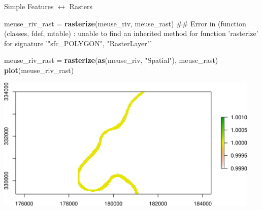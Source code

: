 \documentclass[11pt,ignorenonframetext,]{beamer}
\newenvironment{Shaded}{}{}
\newcommand{\KeywordTok}[1]{\textcolor[rgb]{0.00,0.44,0.13}{\textbf{#1}}}
\newcommand{\StringTok}[1]{\textcolor[rgb]{0.25,0.44,0.63}{#1}}
\newcommand{\NormalTok}[1]{#1}
\let\oldShaded\Shaded
\let\endoldShaded\endShaded
\renewenvironment{Shaded}{\footnotesize\begin{spacing}{0.9}\oldShaded}{\endoldShaded\end{spacing}}
\let\oldverbatim\verbatim
\let\endoldverbatim\endverbatim
\newcommand{\scriptoutput}{
  \renewenvironment{Shaded}{\scriptsize\begin{spacing}{0.9}\oldShaded}{\endoldShaded\end{spacing}}
  \renewenvironment{verbatim}{\scriptsize\begin{spacing}{0.9}\oldverbatim}{\endoldverbatim\end{spacing}}
}
\begin{document}
\begin{frame}[fragile,t]{Simple Features \(\longleftrightarrow\)
Rasters}

\scriptoutput

\begin{Shaded}
\begin{Highlighting}[]
\NormalTok{meuse_riv_rast =}\StringTok{ }\KeywordTok{rasterize}\NormalTok{(meuse_riv, meuse_rast)}
\NormalTok{## Error in (function (classes, fdef, mtable) : unable to find an inherited method for function 'rasterize' for signature '"sfc_POLYGON", "RasterLayer"'}

\NormalTok{meuse_riv_rast =}\StringTok{ }\KeywordTok{rasterize}\NormalTok{(}\KeywordTok{as}\NormalTok{(meuse_riv, }\StringTok{"Spatial"}\NormalTok{), meuse_rast)}
\KeywordTok{plot}\NormalTok{(meuse_riv_rast)}
\end{Highlighting}
\end{Shaded}

\begin{center}\includegraphics[width=0.95\textwidth]{Lec17_files/figure-beamer/unnamed-chunk-37-1} \end{center}

\end{frame}
\end{document}
